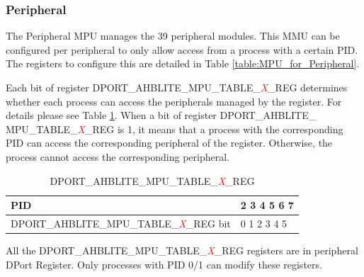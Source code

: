 
\subsubsection{Peripheral}

The Peripheral MPU manages the 39 peripheral modules. This MMU can be configured per peripheral to only allow access from a process with a certain PID. The registers to configure this are detailed in Table \ref{table:MPU_for_Peripheral}.



Each bit of register DPORT\_AHBLITE\_MPU\_TABLE\_\textcolor{red}{\it{X}}\_REG determines whether each process can access the peripherals managed by the register. For details please see Table \ref{table:DPORT_AHBLITE_MPU_TABLE_X_REG}.
When a bit of register DPORT\_AHBLITE\_\\MPU\_TABLE\_\textcolor{red}{\it{X}}\_REG is 1, it means that a process with the corresponding PID can access the corresponding peripheral of the register. Otherwise, the process cannot access the corresponding peripheral.



\begin{table}[H]
    \centering
    \caption{DPORT\_AHBLITE\_MPU\_TABLE\_\textcolor{red}{\it{X}}\_REG}
    \label{table:DPORT_AHBLITE_MPU_TABLE_X_REG}
       \begin{tabular}{|p{11cm}|p{4cm}|}
        \hline
        \rowcolor{lightgray}
        PID & 2 3 4 5 6 7 \\
        \hline
        DPORT\_AHBLITE\_MPU\_TABLE\_\textcolor{red}{\it{X}}\_REG bit & 0 1 2 3 4 5 \\
        \hline
    \end{tabular}
\end{table}

All the DPORT\_AHBLITE\_MPU\_TABLE\_\textcolor{red}{\it{X}}\_REG registers are in peripheral DPort Register. Only processes with PID 0/1 can modify these registers.